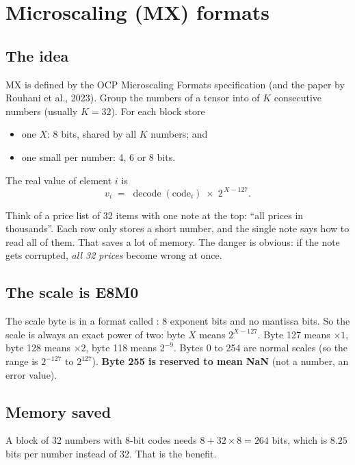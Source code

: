 \section{Microscaling (MX) formats}

\subsection{The idea}
MX is defined by the OCP Microscaling Formats specification (and the paper by Rouhani et al., 2023). Group the
numbers of a tensor into  of $K$ consecutive numbers (usually $K=32$). For each block store
\begin{itemize}
\item one  $X$: 8 bits, shared by all $K$ numbers; and
\item one small  per number: 4, 6 or 8 bits.
\end{itemize}
The real value of element $i$ is
\begin{equation}\label{eq:mx}
v_i \;=\; \operatorname{decode}(\text{code}_i)\;\times\;2^{\,X-127}.
\end{equation}

\begin{plain}
Think of a price list of 32 items with one note at the top: ``all prices in thousands''. Each row only
stores a short number, and the single note says how to read all of them. That saves a lot of memory. The
danger is obvious: if the note gets corrupted, \emph{all 32 prices} become wrong at once.
\end{plain}

\subsection{The scale is E8M0}
The scale byte is in a format called : 8 exponent bits and no mantissa bits. So the scale is always
an exact power of two: byte $X$ means $2^{X-127}$. Byte 127 means $\times1$, byte 128 means $\times2$, byte 118
means $2^{-9}$. Bytes 0 to 254 are normal scales (so the range is $2^{-127}$ to $2^{127}$). \textbf{Byte 255 is
reserved to mean NaN} (not a number, an error value).

\subsection{Memory saved}
A block of 32 numbers with 8-bit codes needs $8+32\times8=264$ bits, which is $8.25$ bits per number instead
of 32. That is the benefit.

